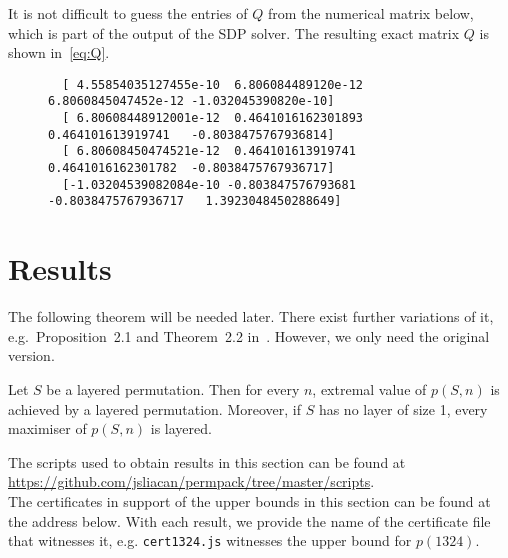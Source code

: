 It is not difficult to guess the entries of $Q$ from the numerical matrix below, which is part of the output of the SDP solver. The resulting exact matrix $Q$ is shown in~\eqref{eq:Q}.
\begin{figure}[ht]
\begin{lstlisting}
  [ 4.55854035127455e-10  6.806084489120e-12  6.8060845047452e-12 -1.032045390820e-10]
  [ 6.80608448912001e-12  0.4641016162301893  0.464101613919741   -0.8038475767936814]
  [ 6.80608450474521e-12  0.464101613919741   0.4641016162301782  -0.8038475767936717]
  [-1.03204539082084e-10 -0.803847576793681  -0.8038475767936717   1.3923048450288649]
\end{lstlisting}
\end{figure}

\section{Results}
\label{sec:mainresults}

The following theorem will be needed later. There exist further variations of it, e.g.~Proposition~2.1 and Theorem~2.2 in~\cite{albert2002packing}. However, we only need the original version.

\begin{theorem}
\label{thm:layered}
Let $S$ be a layered permutation. Then for every $n$, extremal value of $p(S,n)$ is achieved by a layered permutation. Moreover, if $S$ has no layer of size 1, every maximiser of $p(S,n)$ is layered.
\end{theorem}

\noindent The scripts used to obtain results in this section can be found at\\

\url{https://github.com/jsliacan/permpack/tree/master/scripts}.\\

\noindent The certificates in support of the upper bounds in this section can be found at the address below. With each result, we provide the name of the certificate file that witnesses it, e.g. \texttt{cert1324.js} witnesses the upper bound for $p(1324)$.\\

